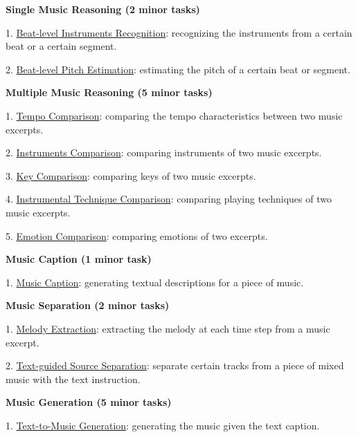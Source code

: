 \textbf{Single Music Reasoning (2 minor tasks)}	

1. \underline{Beat-level Instruments Recognition}: recognizing the instruments from a certain beat or a certain segment.


2. \underline{Beat-level Pitch Estimation}: estimating the pitch of a certain beat or segment.


\textbf{Multiple Music Reasoning (5 minor tasks)}

1. \underline{Tempo Comparison}: comparing the tempo characteristics between two music excerpts.

2. \underline{Instruments Comparison}: comparing instruments of two music excerpts.

3. \underline{Key Comparison}: comparing keys of two music excerpts.

4. \underline{Instrumental Technique Comparison}: comparing playing techniques of two music excerpts.

5. \underline{Emotion Comparison}: comparing emotions of two excerpts.

\textbf{Music Caption (1 minor task)}

1. \underline{Music Caption}: generating textual descriptions for a piece of music.


\textbf{Music Separation (2 minor tasks)}

1. \underline{Melody Extraction}: extracting the melody at each time step from a music excerpt.

2. \underline{Text-guided Source Separation}: separate certain tracks from a piece of mixed music with the text instruction.

\textbf{Music Generation (5 minor tasks)}


1. \underline{Text-to-Music Generation}: generating the music given the text caption.
 



